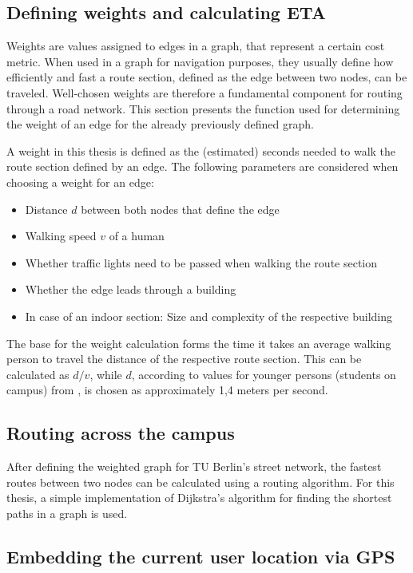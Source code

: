 \subsection{Defining weights and calculating ETA}
Weights are values assigned to edges in a graph, that represent a certain cost metric. When used in a graph for navigation purposes, they usually define how efficiently and fast a route section, defined as the edge between two nodes, can be traveled. Well-chosen weights are therefore a fundamental component for routing through a road network. This section presents the function used for determining the weight of an edge for the already previously defined graph.

A weight in this thesis is defined as the (estimated) seconds needed to walk the route section defined by an edge. The following parameters are considered when choosing a weight for an edge:

\begin{itemize}
	\item Distance $d$ between both nodes that define the edge
	\item Walking speed $v$ of a human
	\item Whether traffic lights need to be passed when walking the route section
	\item Whether the edge leads through a building
	\item In case of an indoor section: Size and complexity of the respective building
\end{itemize}

The base for the weight calculation forms the time it takes an average walking person to travel the distance of the respective route section. This can be calculated as $d / v$, while $d$, according to values for younger persons (students on campus) from \cite{average_walking_speed}, is chosen as approximately 1,4 meters per second.



\subsection{Routing across the campus}
After defining the weighted graph for TU Berlin's street network, the fastest routes between two nodes can be calculated using a routing algorithm. For this thesis, a simple implementation of Dijkstra's algorithm for finding the shortest paths in a graph is used.

\subsection{Embedding the current user location via GPS}

